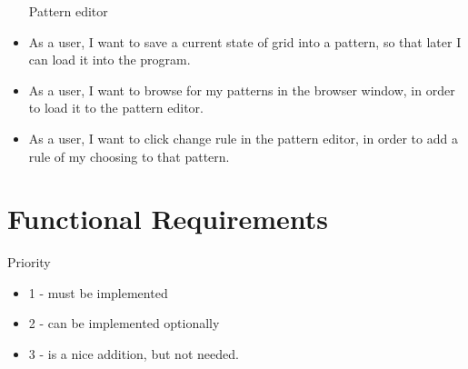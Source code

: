 \documentclass{article}
\begin{document}
\begin{itemize}
		Pattern editor
	\item 
		As a user,
		I want to save a current state of grid into a pattern,
		so that later I can load it into the program.

	\item 
		As a user,
		I want to browse for my patterns in the browser window,
		in order to load it to the pattern editor.

	\item 
		As a user,
		I want to click change rule in the pattern editor,
		in order to add a rule of my choosing to that pattern.
		
\end{itemize}

\newpage

\section{Functional Requirements}
Priority
\begin{itemize} 
\item 1 - must be implemented
\item 2 - can be implemented optionally 
\item 3 - is a nice addition, but not needed.
\end{itemize} 
\end{document}
